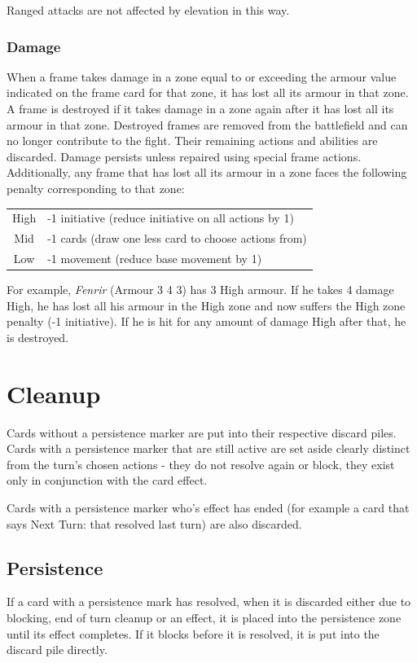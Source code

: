 \documentclass[a4paper, twocolumn]{article}
\begin{document}
Ranged attacks are not affected by elevation in this way.


\subsubsection{Damage}
When a frame takes damage in a zone equal to or exceeding the armour value indicated on the frame card for that zone, it has lost all its armour in that zone.
A frame is destroyed if it takes damage in a zone again after it has lost all its armour in that zone.
Destroyed frames are removed from the battlefield and can no longer contribute to the fight. Their remaining actions and abilities are discarded.
Damage persists unless repaired using special frame actions.
Additionally, any frame that has lost all its armour in a zone faces the following penalty corresponding to that zone:

\begin{tabular}{c p{4cm}}
High &
-1 initiative (reduce initiative on all actions by 1) \\
Mid &
-1 cards (draw one less card to choose actions from) \\
Low &
-1 movement (reduce base movement by 1) \\
\end{tabular}

For example, \emph{Fenrir} (Armour 3 4 3) has 3 High armour. If he takes 4 damage High, he has lost all his armour in the High zone and now suffers the High zone penalty (-1 initiative). If he is hit for any amount of damage High after that, he is destroyed.


\section{Cleanup}
Cards without a persistence marker are put into their respective discard piles.
Cards with a persistence marker that are still active are set aside clearly distinct from the turn's chosen actions - 
they do not resolve again or block, they exist only in conjunction with the card effect.

Cards with a persistence marker who's effect has ended (for example a card that says Next Turn: that resolved last turn) are also discarded.

\subsection{Persistence}
If a card with a persistence mark has resolved, when it is discarded either due to blocking, end of turn cleanup or an effect, it is placed into the persistence zone until its effect completes.
If it blocks before it is resolved, it is put into the discard pile directly.
\end{document}
